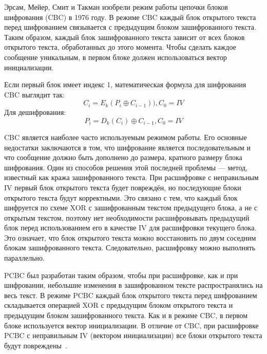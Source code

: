 Эрсам, Мейер, Смит и Такман изобрели режим работы цепочки блоков шифрования (CBC) в 1976 году.
В режиме CBC каждый блок открытого текста перед шифрованием связывается с предыдущим блоком зашифрованного текста.
Таким образом, каждый блок зашифрованного текста зависит от всех блоков открытого текста, обработанных до этого момента.
Чтобы сделать каждое сообщение уникальным, в первом блоке должен использоваться вектор инициализации.

Если первый блок имеет индекс 1, математическая формула для шифрования CBC выглядит так:
\begin{equation}
	C_i = E_k(P_i \oplus C_{i-1})),
	C_0 = IV
\end{equation}
Для дешифрования:
\begin{equation}
	P_i = D_k(C_i) \oplus C_{i-1},
	C_0 = IV
\end{equation}

CBC является наиболее часто используемым режимом работы.
Его основные недостатки заключаются в том, что шифрование является последовательным и что сообщение должно быть дополнено до размера, кратного размеру блока шифрования.
Один из способов решения этой последней проблемы --- метод, известный как кража зашифрованного текста. 
При расшифровке с неправильным IV первый блок открытого текста будет повреждён, но последующие блоки открытого текста будут корректными.
Это связано с тем, что каждый блок шифруется по схеме XOR с зашифрованным текстом предыдущего блока, а не с открытым текстом, поэтому нет необходимости расшифровывать предыдущий блок перед использованием его в качестве IV для расшифровки текущего блока.
Это означает, что блок открытого текста можно восстановить по двум соседним блокам зашифрованного текста.
Следовательно, расшифровку можно выполнять параллельно.

PCBC был разработан таким образом, чтобы при расшифровке, как и при шифровании, небольшие изменения в зашифрованном тексте распространялись на весь текст.
В режиме PCBC каждый блок открытого текста перед шифрованием складывается операцией XOR с предыдущим блоком открытого текста и предыдущим блоком зашифрованного текста.
Как и в режиме CBC, в первом блоке используется вектор инициализации.
В отличие от CBC, при расшифровке PCBC с неправильным IV (вектором инициализации) все блоки открытого текста будут повреждены~\cite{pcbc}.
